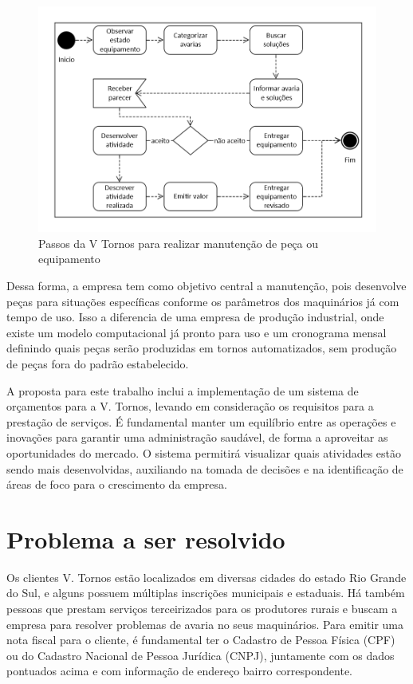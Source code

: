\begin{figure}[htb!]
    \centering
    \includegraphics[width=.75\linewidth]{figs/diagrama_atividade_VTornos.png}
    \caption{Passos da V Tornos para realizar manutenção de peça ou equipamento}
    \label{fig:diagrama_VTornos}
\end{figure}

Dessa forma, a empresa tem como objetivo central a manutenção, pois desenvolve peças para situações específicas conforme os parâmetros dos maquinários já com tempo de uso. Isso a diferencia de uma empresa de produção industrial, onde existe um modelo computacional já pronto para uso e um cronograma mensal definindo quais peças serão produzidas em tornos automatizados, sem produção de peças fora do padrão estabelecido.

A proposta para este trabalho inclui a implementação de um sistema de orçamentos para a V. Tornos, levando em consideração os requisitos para a prestação de serviços. É fundamental manter um equilíbrio entre as operações e inovações para garantir uma administração saudável, de forma a aproveitar as oportunidades do mercado. O sistema permitirá visualizar quais atividades estão sendo mais desenvolvidas, auxiliando na tomada de decisões e na identificação de áreas de foco para o crescimento da empresa.

\section{Problema a ser resolvido}
\label{sec:problema}

Os clientes V. Tornos estão localizados em diversas cidades do estado Rio Grande do Sul, e alguns possuem múltiplas inscrições municipais e estaduais. Há também pessoas que prestam serviços terceirizados para os produtores rurais e buscam a empresa para resolver problemas de avaria no seus maquinários. Para emitir uma nota fiscal para o cliente, é fundamental ter o Cadastro de Pessoa Física (CPF) ou do Cadastro Nacional de Pessoa Jurídica (CNPJ), juntamente com os dados pontuados acima e com informação de endereço bairro correspondente.

